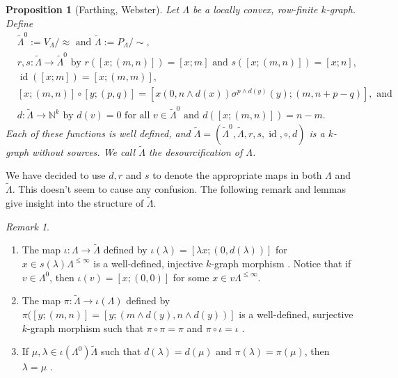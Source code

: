 \documentclass[a4paper,12pt]{amsart}
\numberwithin{equation}{section}
\newtheorem{prop}[thm]{Proposition}
\theoremstyle{definition}
\theoremstyle{remark}
\newtheorem{rmk}[thm]{Remark}
\begin{document}
\begin{prop}[Farthing, Webster] Let $\Lambda$ be a locally convex, row-finite 
$k$-graph.
Define
\begin{align*}
&{\tilde{\Lambda}}^0 := V_\Lambda/\!\!\approx \text{\ and\ }{\tilde{\Lambda}} := P_{\Lambda}/\!\!\sim, \\
&r,s:{\tilde{\Lambda}} \to {\tilde{\Lambda}}^0  \text{ by } 
r([x;(m,n)]) = [x;m] \text{ and }
 s([x;(m,n)]) = [x;n],\\
&\operatorname{id}([x;m])=[x;(m,m)],\\
&[x;(m,n)] \circ [y;(p,q)] = [x(0,n \wedge d(x))\sigma^{p \wedge d(y)}(y);(m,n+p-q)],
\text{ and}\\
&d:{\tilde{\Lambda}} \to {\mathbb{N}}^k \text{ by } 
d(v) = 0 \text{ for all } v \in {\tilde{\Lambda}}^0 \text{ and }
d([x;(m,n)]) = n-m. 
\end{align*}
Each of these functions is well defined, and 
 ${\tilde{\Lambda}}=({\tilde{\Lambda}}^0, {\tilde{\Lambda}}, r, s, \operatorname{id},\circ, d)$  is a $k$-graph without sources.  We call ${\tilde{\Lambda}}$ the
\emph{desourcification} of $\Lambda$.  
\end{prop}

We have decided to use $d,r$ and $s$ to denote the appropriate maps in 
both $\Lambda$ and ${\tilde{\Lambda}}$.  This doesn't seem to cause any confusion.   The following remark and lemmas
 give insight into the structure of $\tilde\Lambda$.

\begin{rmk}\label{rmk-structurelambda0}
\begin{enumerate}
\item\label{it:rmk6.2a} The map
$\iota:\Lambda \to {\tilde{\Lambda}}$ defined by $\iota(\lambda) = [\lambda x;(0,d(\lambda))]$
for $x \in s(\lambda)\Lambda^{\leq \infty}$ is a well-defined, injective $k$-graph 
morphism  \cite[Proposition~4.13]{W}.  Notice that if $v \in \Lambda^0$, then  $\iota(v) = [x; (0,0)]$ for some $x \in v\Lambda^{\leq \infty}$. 
\item The map
$\pi:{\tilde{\Lambda}} \to \iota(\Lambda)$  defined by  
$\pi([y;(m,n)] = [y; (m \wedge d(y), n \wedge d(y))]$ 
is a well-defined, surjective $k$-graph morphism  such that $\pi \circ \pi = \pi$ and
$\pi \circ \iota=\iota$ \cite[page~168]{W}.
\item\label{item-c} If $\mu, \lambda \in \iota(\Lambda^0){\tilde{\Lambda}}$ such 
that $d(\lambda)=d(\mu)$ and $\pi(\lambda)=\pi(\mu)$, then $\lambda=\mu$  \cite[Lemma~4.19]{W}.
\end{enumerate}
\end{rmk}
\end{document}
